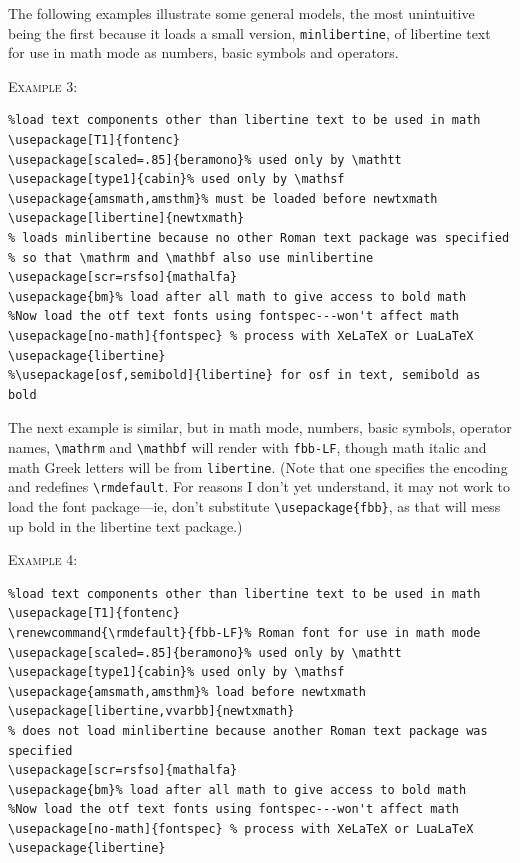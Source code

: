 \documentclass[11pt]{article}
\theoremstyle{oldplain}
\theoremstyle{plain}
\begin{document}
The following examples illustrate some general models, the most unintuitive being the first because it loads a small version, {\tt minlibertine}, of libertine text for use in math mode as numbers, basic symbols and operators.

\textsc{Example 3:}
\begin{verbatim}
%load text components other than libertine text to be used in math
\usepackage[T1]{fontenc}
\usepackage[scaled=.85]{beramono}% used only by \mathtt
\usepackage[type1]{cabin}% used only by \mathsf
\usepackage{amsmath,amsthm}% must be loaded before newtxmath
\usepackage[libertine]{newtxmath}
% loads minlibertine because no other Roman text package was specified
% so that \mathrm and \mathbf also use minlibertine
\usepackage[scr=rsfso]{mathalfa}
\usepackage{bm}% load after all math to give access to bold math
%Now load the otf text fonts using fontspec---won't affect math
\usepackage[no-math]{fontspec} % process with XeLaTeX or LuaLaTeX
\usepackage{libertine}
%\usepackage[osf,semibold]{libertine} for osf in text, semibold as bold
\end{verbatim}
The next example is similar, but in math mode, numbers, basic symbols, operator names, \verb|\mathrm| and \verb|\mathbf| will render with {\tt fbb-LF}, though  math italic and math Greek letters will be from {\tt libertine}. (Note that one specifies the encoding and redefines \verb|\rmdefault|. For reasons I don't yet understand, it may not work to load the font package---ie, don't substitute \verb|\usepackage{fbb}|, as that will mess up bold in the libertine text package.) 

\textsc{Example 4:}
\begin{verbatim}
%load text components other than libertine text to be used in math
\usepackage[T1]{fontenc}
\renewcommand{\rmdefault}{fbb-LF}% Roman font for use in math mode
\usepackage[scaled=.85]{beramono}% used only by \mathtt
\usepackage[type1]{cabin}% used only by \mathsf
\usepackage{amsmath,amsthm}% load before newtxmath
\usepackage[libertine,vvarbb]{newtxmath}
% does not load minlibertine because another Roman text package was specified
\usepackage[scr=rsfso]{mathalfa}
\usepackage{bm}% load after all math to give access to bold math
%Now load the otf text fonts using fontspec---won't affect math
\usepackage[no-math]{fontspec} % process with XeLaTeX or LuaLaTeX
\usepackage{libertine}
\end{verbatim}
\end{document}
